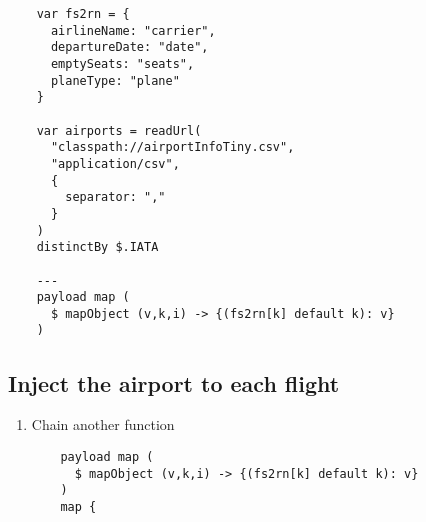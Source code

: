 \begin{enumerate}[resume*]
\begin{verbatim}
    var fs2rn = {
      airlineName: "carrier",
      departureDate: "date",
      emptySeats: "seats",
      planeType: "plane"
    }

    var airports = readUrl(
      "classpath://airportInfoTiny.csv",
      "application/csv",
      {
        separator: ","
      }
    )
    distinctBy $.IATA

    ---
    payload map (
      $ mapObject (v,k,i) -> {(fs2rn[k] default k): v}
    )
  \end{verbatim}
\end{enumerate}

\subsection{Inject the airport to each flight}
\begin{enumerate}[resume*]
\item Chain another  function
  \begin{verbatim}
    payload map (
      $ mapObject (v,k,i) -> {(fs2rn[k] default k): v}
    )
    map {
      

\end{verbatim}
\end{enumerate}

